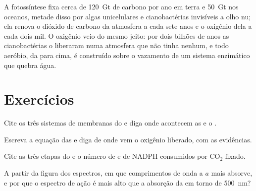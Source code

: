 \begin{example}\label{ex:b1:photosynthesis:global}
A fotossíntese fixa cerca de \qty{120}{Gt} de carbono por ano em terra e
\qty{50}{Gt} nos oceanos, metade disso por algas unicelulares e
cianobactérias invisíveis a olho nu; ela renova o dióxido de carbono da
atmosfera a cada sete anos e o oxigênio dela a cada dois mil. O oxigênio
veio do mesmo jeito: por dois bilhões de anos as cianobactérias o
liberaram numa atmosfera que não tinha nenhum, e todo 
aeróbio, da  para cima, é construído sobre o vazamento de um
sistema enzimático que quebra água.
\end{example}

\section{Exercícios}

\begin{exercise}[$\star$]\label{exo:b1:photosynthesis:1}
Cite os três sistemas de membranas do  e diga onde acontecem
as  e o .
\end{exercise}

\begin{exercise}[$\star$]\label{exo:b1:photosynthesis:2}
Escreva a equação das  e diga de onde vem o oxigênio
liberado, com as evidências.
\end{exercise}

\begin{exercise}[$\star$]\label{exo:b1:photosynthesis:3}
Cite as três etapas do  e o número de  e de NADPH
consumidos por $\mathrm{CO_2}$ fixado.
\end{exercise}

\begin{exercise}[$\star$]\label{exo:b1:photosynthesis:4}
A partir da figura dos espectros, em que comprimentos de onda a
 $a$ mais absorve, e por que o espectro de ação é mais alto que
a absorção da  em torno de \qty{500}{nm}?
\end{exercise}

